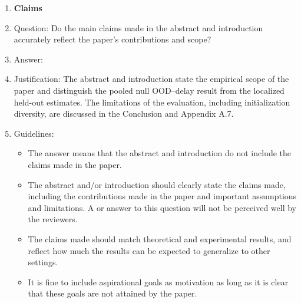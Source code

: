 \documentclass{article}
\begin{document}
\begin{enumerate}

\item {\bf Claims}
    \item[] Question: Do the main claims made in the abstract and introduction accurately reflect the paper's contributions and scope?
    \item[] Answer: \answerYes{}
    \item[] Justification:  The abstract and introduction state the empirical scope of the paper and distinguish the pooled null OOD–delay result from the localized held-out estimates. The limitations of the evaluation, including initialization diversity, are discussed in the Conclusion and Appendix A.7.
    \item[] Guidelines:
    \begin{itemize}
        \item The answer \answerNA{} means that the abstract and introduction do not include the claims made in the paper.
        \item The abstract and/or introduction should clearly state the claims made, including the contributions made in the paper and important assumptions and limitations. A \answerNo{} or \answerNA{} answer to this question will not be perceived well by the reviewers.
        \item The claims made should match theoretical and experimental results, and reflect how much the results can be expected to generalize to other settings.
        \item It is fine to include aspirational goals as motivation as long as it is clear that these goals are not attained by the paper.
    \end{itemize}


\end{enumerate}
\end{document}
